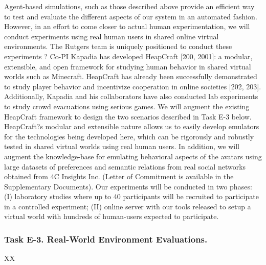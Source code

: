 Agent-based simulations, such as those described above provide an efficient way to test and evaluate the different aspects of our system in an automated fashion. However, in an effort to come closer to actual human experimentation, we will conduct experiments using real human users in shared online virtual environments. The Rutgers team is uniquely positioned to conduct these experiments ? Co-PI Kapadia has developed HeapCraft [200, 2001]: a modular, extensible, and open framework for studying human behavior in shared virtual worlds such as Minecraft. HeapCraft has already been successfully demonstrated to study player behavior and incentivize cooperation in online societies [202, 203]. Additionally, Kapadia and his collaborators have also conducted lab experiments to study crowd evacuations using serious games.
We will augment the existing HeapCraft framework to design the two scenarios described in Task E-3 below. HeapCraft?s modular and extensible nature allows us to easily develop emulators for the technologies being developed here, which can be rigorously and robustly tested in shared virtual worlds using real human users. In addition, we will augment the knowledge-base for emulating behavioral aspects of the avatars using large datasets of preferences and semantic relations from real social networks obtained from 4C Insights Inc. (Letter of Commitment is available in the Supplementary Documents). 
Our experiments will be conducted in two phases: (I) laboratory studies where up to 40 participants will be recruited to participate in a controlled experiment; (II) online server with our tools released to setup a virtual world with hundreds of human-users  expected to participate. 


\subsubsection{Task E-3. Real-World Environment Evaluations.  }

XX

